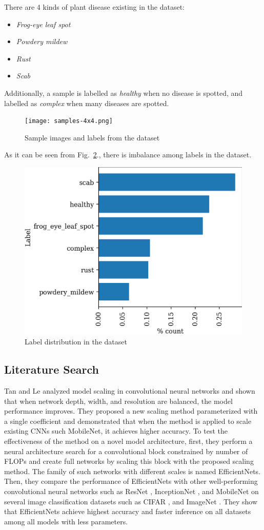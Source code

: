 \documentclass[conference]{IEEEtran}
\begin{document}
There are 4 kinds of plant disease existing in the dataset:
\begin{itemize}
\item \textit{Frog-eye leaf spot}
\item \textit{Powdery mildew}
\item \textit{Rust}
\item \textit{Scab}
\end{itemize}

Additionally, a sample is labelled as \textit{healthy} when no disease is spotted, 
and labelled as \textit{complex} when many diseases are spotted.

\begin{figure}
    \centerline{\texttt{[image: samples-4x4.png]}}
    \caption{Sample images and labels from the dataset}
    \label{fig:samples}
\end{figure}

As it can be seen from Fig.~\ref{fig:label-dist}., there is imbalance among labels in the dataset.

\begin{figure}
    \centerline{\includegraphics[width = 0.45 \textwidth]{label-dist-ratio.png}}
    \caption{Label distribution in the dataset}
    \label{fig:label-dist}
\end{figure}


\subsection{Literature Search}

Tan and Le \cite{EfficientNet} analyzed model scaling in convolutional neural networks 
and shown that when network depth, width, and resolution are balanced, the model performance
improves. They proposed a new scaling method parameterized with a single coefficient and
demonstrated that when the method is applied to scale existing CNNs such MobileNet, it 
achieves higher accuracy.
To test the effectiveness of the method on a novel model architecture, first, 
they perform a neural architecture search for a convolutional block constrained 
by number of FLOPs and create full networks by scaling this block with 
the proposed scaling method.
The family of such networks with different scales is named EfficientNets.
Then, they compare the performance of EfficientNets with other well-performing
convolutional neural networks such as 
ResNet \cite{ResNet2016}, 
InceptionNet \cite{InceptionNetV1} \cite{InceptionNetV3} \cite{InceptionNetV4}, 
and MobileNet \cite{MobileNet2017} 
on several image classification datasets such as 
CIFAR \cite{CIFAR}, and ImageNet \cite{ImageNet2014}. 
They show that EfficientNets achieve highest accuracy and faster inference on 
all datasets among all models with less parameters.
\end{document}
